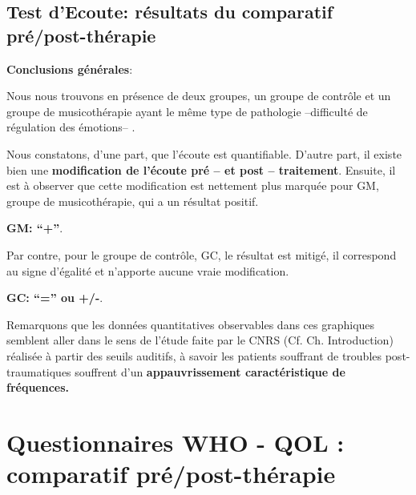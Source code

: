  

\subsection{Test d'Ecoute: résultats du comparatif pré/post-thérapie}

\textbf{Conclusions générales}:

             Nous nous trouvons
           en présence de deux groupes, un groupe de contrôle et un
           groupe de musicothérapie ayant le même type de
           pathologie --difficulté de régulation des émotions-- .


Nous constatons, d'une part, que l'écoute est quantifiable.
           D'autre part, il existe bien
          une \textbf{modification de l'écoute pré -- et post -- traitement}.
Ensuite, il est à observer que
          cette modification est nettement plus marquée
          pour GM, groupe de musicothérapie, qui a un résultat positif.


          \textbf{GM: ``+''}.


Par contre,  pour le groupe de contrôle, GC, le résultat est mitigé, il correspond au signe d'égalité et n'apporte aucune vraie modification.

          \textbf{GC:  ``='' ou +/-}.


        Remarquons que les données quantitatives observables dans ces graphiques semblent aller dans le
sens de  l'étude faite par le
CNRS (Cf. Ch. Introduction) \autocite{affectiveDisorders} réalisée à partir des seuils auditifs, à savoir
les patients souffrant de troubles post-traumatiques souffrent d'un
\textbf{appauvrissement caractéristique de fréquences.}

\section{Questionnaires WHO - QOL : comparatif pré/post-thérapie }



